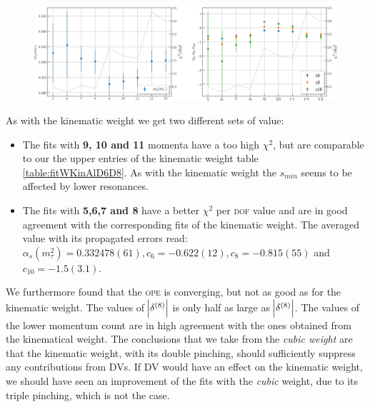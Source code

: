 \documentclass[../../index.tex]{subfiles}
\begin{document}
\begin{figure}
  \centering
  \includegraphics[width=\textwidth]{./images/fitWCubeAlD6D8D10.png}
  \label{fig:fitWCubeAlpha}
\end{figure}
As with the kinematic weight we get two different sets of value:
\begin{itemize}
  \item The fits with \textbf{9, 10 and 11} momenta have a too high $\chi^2$,
    but are comparable to our the upper entries of the kinematic weight table
    \cref{table:fitWKinAlD6D8}. As with the kinematic weight the $s_{min}$ seems
    to be affected by lower resonances.
  \item The fits with \textbf{5,6,7 and 8} have a better $\chi^2$ per
    \textsc{dof} value and are in good agreement with the corresponding fits of
    the kinematic weight. The averaged value with its propagated errors read:
    $\alpha_s(m_\tau^2)=0.332478(61), c_6=-0.622(12), c_8=-0.815(55)$ and $c_{10}=-1.5(3.1)$.
\end{itemize}
We furthermore found that the \textsc{ope} is converging, but not as good as for
the kinematic weight. The values of $\abs{\delta^{(8)}}$ is only half as large
as $\abs{\delta^{(8)}}$.
The values of the lower momentum count are in high agreement with the
ones obtained from the kinematical weight. The
conclusions that we take from the \textit{cubic weight} are that the kinematic
weight, with its double pinching, should sufficiently suppress any contributions
from \textsc{DV}s. If \textsc{DV} would have an effect on the kinematic weight,
we should have seen an improvement of the fits with the \textit{cubic} weight,
due to its triple pinching, which is not the case.
\end{document}
